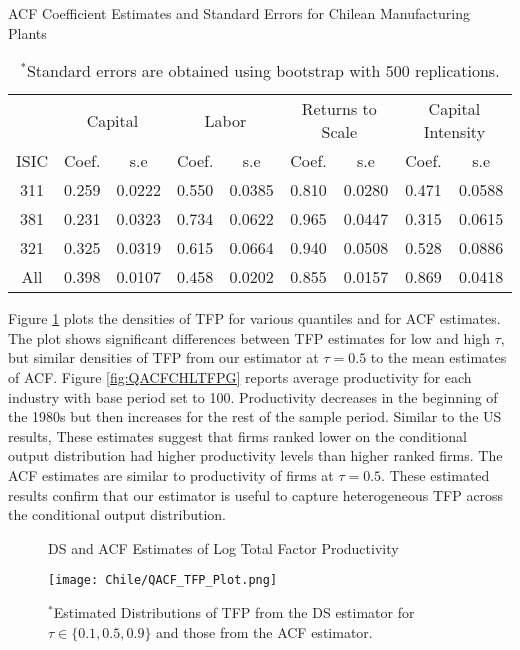 \documentclass[12pt]{article}
\begin{document}
\begin{table}[H]
\centering
\caption{ACF Coefficient Estimates and Standard Errors for Chilean Manufacturing Plants}
\small
\begin{tabular}{ccccccccc}
  \hline\hline & \multicolumn{2}{c}{Capital} & \multicolumn{2}{c}{Labor} & \multicolumn{2}{c}{Returns to Scale} & \multicolumn{2}{c}{Capital Intensity}\\ \cmidrule(lr){2-3} \cmidrule(lr){4-5} \cmidrule(lr){6-7} \cmidrule(lr){8-9}ISIC & Coef. & s.e & Coef. & s.e & Coef. & s.e & Coef. & s.e \\ 
  \hline
311 & 0.259 & 0.0222 & 0.550 & 0.0385 & 0.810 & 0.0280 & 0.471 & 0.0588 \\ 
  381 & 0.231 & 0.0323 & 0.734 & 0.0622 & 0.965 & 0.0447 & 0.315 & 0.0615 \\ 
  321 & 0.325 & 0.0319 & 0.615 & 0.0664 & 0.940 & 0.0508 & 0.528 & 0.0886 \\ 
  All & 0.398 & 0.0107 & 0.458 & 0.0202 & 0.855 & 0.0157 & 0.869 & 0.0418 \\ 
   \hline
\end{tabular}
\caption*{\footnotesize $^{*}$Standard errors are obtained using bootstrap with 500 replications.}
\label{CHLACF}
\end{table}

Figure \ref{fig:QACFCHLTFP} plots the densities of TFP for various quantiles and for ACF estimates. The plot shows significant differences between TFP estimates for low and high $\tau$, but similar densities of TFP from our estimator at $\tau=0.5$ to the mean estimates of ACF. Figure \ref{fig:QACFCHLTFPG} reports average productivity for each industry with base period set to 100. Productivity decreases in the beginning of the 1980s but then increases for the rest of the sample period. Similar to the US results, These estimates suggest that firms ranked lower on the conditional output distribution had higher productivity levels than higher ranked firms. The ACF estimates are similar to productivity of firms at $\tau=0.5$. These estimated results confirm that our estimator is useful to capture heterogeneous TFP across the conditional output distribution.

\begin{figure}[H]
	\centering
	\caption{DS and ACF Estimates of Log Total Factor Productivity}
	\texttt{[image: Chile/QACF\_TFP\_Plot.png]}
	\caption*{\footnotesize $^{*}$Estimated Distributions of TFP from the DS estimator for $\tau \in \{0.1, 0.5, 0.9\}$ and those from  the ACF estimator.}
	\label{fig:QACFCHLTFP}
\end{figure}
\end{document}
